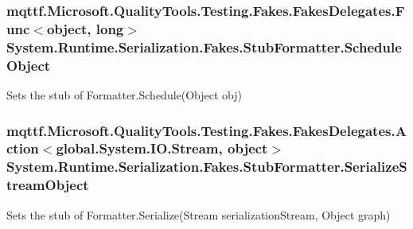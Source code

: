 \hypertarget{class_system_1_1_runtime_1_1_serialization_1_1_fakes_1_1_stub_formatter_a16a2db7f3a043cc1d52ce7c741155f8e}{
\subsubsection[{Schedule\-Object}]{\setlength{\rightskip}{0pt plus 5cm}mqttf.\-Microsoft.\-Quality\-Tools.\-Testing.\-Fakes.\-Fakes\-Delegates.\-Func$<$object, long$>$ System.\-Runtime.\-Serialization.\-Fakes.\-Stub\-Formatter.\-Schedule\-Object}}\label{class_system_1_1_runtime_1_1_serialization_1_1_fakes_1_1_stub_formatter_a16a2db7f3a043cc1d52ce7c741155f8e}


Sets the stub of Formatter.\-Schedule(\-Object obj)

\hypertarget{class_system_1_1_runtime_1_1_serialization_1_1_fakes_1_1_stub_formatter_a8d8c7edc9f967890dad00f50c766bc1a}{
\subsubsection[{Serialize\-Stream\-Object}]{\setlength{\rightskip}{0pt plus 5cm}mqttf.\-Microsoft.\-Quality\-Tools.\-Testing.\-Fakes.\-Fakes\-Delegates.\-Action$<$global.\-System.\-I\-O.\-Stream, object$>$ System.\-Runtime.\-Serialization.\-Fakes.\-Stub\-Formatter.\-Serialize\-Stream\-Object}}\label{class_system_1_1_runtime_1_1_serialization_1_1_fakes_1_1_stub_formatter_a8d8c7edc9f967890dad00f50c766bc1a}


Sets the stub of Formatter.\-Serialize(\-Stream serialization\-Stream, Object graph)

